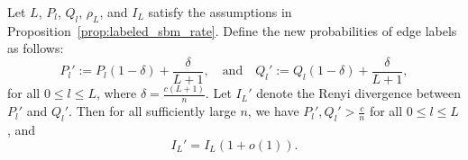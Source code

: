 \documentclass{article}
\begin{document}
\begin{lemma}\label{lemma: first}
Let $L$, $P_l$, $Q_l$, $\rho_L$, and $I_L$ satisfy the assumptions in Proposition~\ref{prop:labeled_sbm_rate}. Define the new probabilities of edge labels as follows:
\begin{equation*}
P_l' := P_l(1-\delta) + \frac{\delta}{L+1}, \quad \text{and} \quad
Q_l' := Q_l(1-\delta) + \frac{\delta}{L+1},
\end{equation*}
for all $0 \leq l \leq L$, where $\delta = \frac{c(L+1)}{n}$. Let $I_L'$ denote the  Renyi divergence between $P_l'$ and $Q_l'$. Then for all sufficiently large $n$, we have $P_l', Q_l' > \frac{c}{n}$ for all $0 \leq l \leq L$, and 
\begin{equation*}
I_L' = I_L(1+o(1)).
\end{equation*}
\end{lemma}
\end{document}
